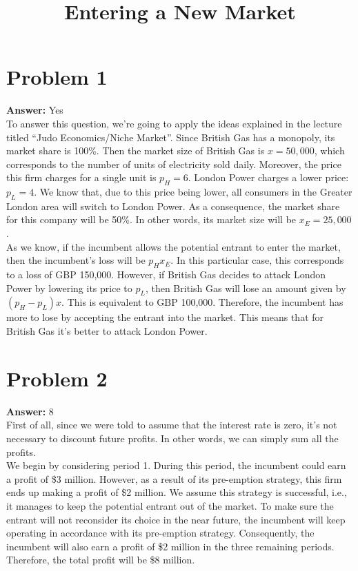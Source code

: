 \documentclass[11pt]{article}
\date{}
\title{Entering a New Market}
\begin{document}
\thispagestyle{empty}
\pagestyle{empty}
\section*{Problem 1}
\label{sec:orgf191396}

\textbf{Answer:} Yes\\

To answer this question, we're going to apply the ideas explained in the lecture
titled ``Judo Economics/Niche Market''. Since British Gas has a monopoly, its
market share is 100\%. Then the market size of British Gas is \(x=50,000\),
which corresponds to the number of units of electricity sold daily. Moreover,
the price this firm charges for a single unit is \(p_H=6\). London Power
charges a lower price: \(p_L=4\). We know that, due to this price being lower,
all consumers in the Greater London area will switch to London Power. As a
consequence, the market share for this company will be 50\%. In other words, its
market size will be \(x_E=25,000\).\\
As we know, if the incumbent allows the potential entrant to enter the market,
then the incumbent's loss will be \(p_H x_E\). In this particular case, this
corresponds to a loss of GBP 150,000. However, if British Gas decides to attack
London Power by lowering its price to \(p_L\), then British Gas will lose an
amount given by \((p_H-p_L)x\). This is equivalent to GBP 100,000. Therefore,
the incumbent has more to lose by accepting the entrant into the market. This
means that for British Gas it's better to attack London Power.
\section*{Problem 2}
\label{sec:orgb879074}

\textbf{Answer:} 8\\

First of all, since we were told to assume that the interest rate is zero, it's
not necessary to discount future profits. In other words, we can simply sum all
the profits.\\
We begin by considering period 1. During this period, the incumbent could earn a
profit of \$3 million. However, as a result of its pre-emption strategy, this
firm ends up making a profit of \$2 million. We assume this strategy is
successful, i.e., it manages to keep the potential entrant out of the market. To
make sure the entrant will not reconsider its choice in the near future, the
incumbent will keep operating in accordance with its pre-emption strategy.
Consequently, the incumbent will also earn a profit of \$2 million in the three
remaining periods. Therefore, the total profit will be \$8 million.
\end{document}
